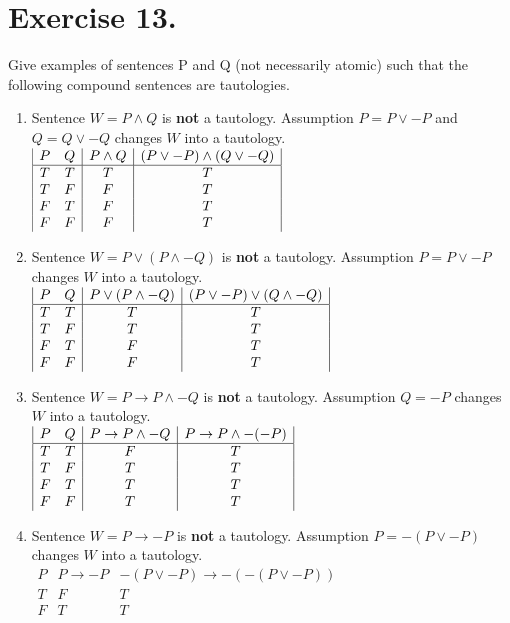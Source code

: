 \documentclass{article}
\begin{document}
\section*{Exercise 13.}
Give examples of sentences P and Q (not necessarily atomic) such that the following compound sentences are tautologies.
\singlespace
\begin{enumerate}[label=(\alph*)]
\item Sentence \(W = P \land Q\) is \textbf{not} a tautology. Assumption \(P = P \lor -P\) and \(Q = Q \lor -Q\) changes \(W\) into a tautology.\\
\(
\begin{array}{|c c|c|c|}
P & Q & P \land Q & (P \lor -P) \land (Q \lor -Q)\\
\hline
T & T & T & T\\
T & F & F & T\\
F & T & F & T\\
F & F & F & T\\
\end{array}
\)
\medskip
\item Sentence \(W = P \lor (P \land -Q)\) is \textbf{not} a tautology. Assumption \(P = P \lor -P\) changes \(W\) into a tautology.\\ 
\(
\begin{array}{|c c|c|c|}
P & Q & P \lor (P \land -Q) & (P \lor -P) \lor (Q \land -Q)\\
\hline
T & T & T & T\\
T & F & T & T\\
F & T & F & T\\
F & F & F & T\\
\end{array}
\)
\medskip

\item Sentence \(W = P \rightarrow P \land -Q\) is \textbf{not} a tautology. Assumption \(Q = -P\) changes \(W\) into a tautology.\\ 
\(
\begin{array}{|c c|c|c|}
    P & Q & P \rightarrow P \land -Q & P \rightarrow P \land -(-P)\\
\hline
T & T & F & T\\
T & F & T & T\\
F & T & T & T\\
F & F & T & T\\
\end{array}
\)
\medskip

\item Sentence \(W = P \rightarrow -P\) is \textbf{not} a tautology. Assumption \(P = -(P \lor -P)\) changes \(W\) into a tautology.\\ 
\(
\begin{array}{|c|c|c|}
    P & P \rightarrow -P & -(P \lor -P) \rightarrow -(-(P \lor -P))\\
\hline
T & F & T\\
F & T & T\\
\end{array}
\)
\medskip
\end{enumerate}
\end{document}
